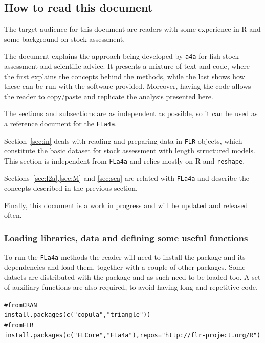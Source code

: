 \documentclass[a4paper,english,10pt]{article}\usepackage[]{graphicx}\usepackage[]{color}
\makeatletter
\newcommand{\hlstr}[1]{\textcolor[rgb]{0.2,0.2,0.2}{#1}}%
\newcommand{\hlcom}[1]{\textcolor[rgb]{0.2,0.267,0.4}{#1}}%
\newcommand{\hlstd}[1]{\textcolor[rgb]{0,0,0}{#1}}%
\newcommand{\hlkwc}[1]{\textcolor[rgb]{0.361,0.506,0.596}{#1}}%
\newcommand{\hlkwd}[1]{\textcolor[rgb]{0.361,0.506,0.596}{#1}}%
\newenvironment{kframe}{%
 \def\at@end@of@kframe{}%
 \ifinner\ifhmode%
  \def\at@end@of@kframe{\end{minipage}}%
  \begin{minipage}{\columnwidth}%
 \fi\fi%
 \def\FrameCommand##1{\hskip\@totalleftmargin \hskip-\fboxsep
 \colorbox{shadecolor}{##1}\hskip-\fboxsep
     \hskip-\linewidth \hskip-\@totalleftmargin \hskip\columnwidth}%
 \MakeFramed {\advance\hsize-\width
   \@totalleftmargin\z@ \linewidth\hsize
   \@setminipage}}%
 {\par\unskip\endMakeFramed%
 \at@end@of@kframe}
\newenvironment{knitrout}{}{} %
\newcommand{\initiative}[1]{{\texttt{#1}}}
\newcommand{\pkg}[1]{{\texttt{#1}}}
\newcommand{\R}{{\normalfont\textsf{R }}{}}
\makeatother
\begin{document}
\subsection{How to read this document}

The target audience for this document are readers with some experience in R and some background on stock assessment.

The document explains the approach being developed by \initiative{a4a} for fish stock assessment and scientific advice. It presents a mixture of text and code, where the first explains the concepts behind the methods, while the last shows how these can be run with the software provided. Moreover, having the code allows the reader to copy/paste and replicate the analysis presented here.

The sections and subsections are as independent as possible, so it can be used as a reference document for the \pkg{FLa4a}. 

Section~\ref{sec:in} deals with reading and preparing data in \pkg{FLR} objects, which constitute the basic dataset for stock assessment with length structured models. This section is independent from \pkg{FLa4a} and relies mostly on \R and \pkg{reshape}.

Sections~\ref{sec:l2a},\ref{sec:M} and \ref{sec:sca} are related with \pkg{FLa4a} and describe the concepts described in the previous section.

Finally, this document is a work in progress and will be updated and released often.

\subsubsection{Loading libraries, data and defining some useful functions}

To run the \pkg{FLa4a} methods the reader will need to install the package and its dependencies and load them, together with a couple of other packages. Some datsets are distributed with the package and as such need to be loaded too. A set of auxiliary functions are also required, to avoid having long and repetitive code.

\begin{knitrout}
\color{fgcolor}\begin{kframe}
\begin{alltt}
\hlcom{# from CRAN}
\hlkwd{install.packages}\hlstd{(}\hlkwd{c}\hlstd{(}\hlstr{"copula"}\hlstd{,}\hlstr{"triangle"}\hlstd{))}
\hlcom{# from FLR}
\hlkwd{install.packages}\hlstd{(}\hlkwd{c}\hlstd{(}\hlstr{"FLCore"}\hlstd{,} \hlstr{"FLa4a"}\hlstd{),} \hlkwc{repos}\hlstd{=}\hlstr{"http://flr-project.org/R"}\hlstd{)}
\end{alltt}
\end{kframe}
\end{knitrout}
\end{document}
